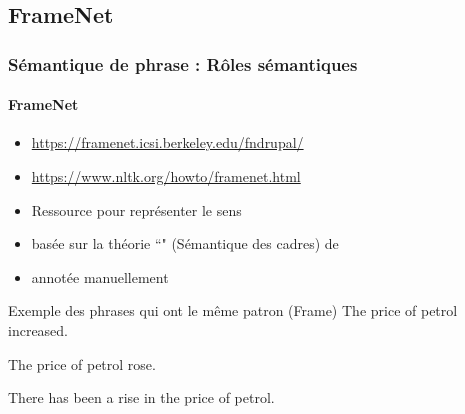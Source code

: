 \documentclass[xcolor=table]{beamer}
\begin{document}
\subsection{FrameNet}

\begin{frame}
\frametitle{Sémantique de phrase : Rôles sémantiques}
\framesubtitle{FrameNet}

\begin{minipage}{.68\textwidth}
	\begin{itemize}
		\item {\scriptsize \url{https://framenet.icsi.berkeley.edu/fndrupal/}}
		\item {\scriptsize \url{https://www.nltk.org/howto/framenet.html}}
		\item Ressource pour représenter le sens 
		\item basée sur la théorie ``" (Sémantique des cadres) de 
		\item annotée manuellement
	\end{itemize}
\end{minipage}
\begin{minipage}{.3\textwidth}
\end{minipage}

\begin{exampleblock}{Exemple des phrases qui ont le même patron (Frame)}
	The price of petrol increased.
	
	The price of petrol rose.
	
	There has been a rise in the price of petrol.
\end{exampleblock}

	
\end{frame}
\end{document}
